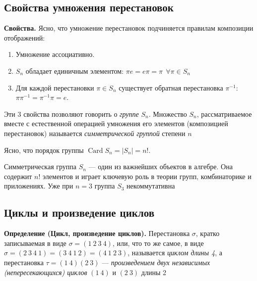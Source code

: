 \documentclass[a4paper,12pt]{article}
\theoremstyle{definition}
\theoremstyle{plain}
\theoremstyle{remark}
\begin{document}
	
	\subsection{Свойства умножения перестановок}
	
	\noindent \textbf{Свойства.}
	Ясно, что умножение перестановок подчиняется правилам композиции отображений:
	\begin{enumerate}
		\item Умножение ассоциативно.
		\item $S_n$ обладает единичным элементом: $\pi e = e \pi = \pi \ \ \forall \pi \in S_n$
		\item Для каждой перестановки $\pi \in S_n$ существует обратная перестановка $\pi^{-1}$: $\pi \pi^{-1} = \pi^{-1} \pi = e$.
	\end{enumerate}
	
	Эти 3 свойства позволяют говорить о \textit{группе} $S_n$. Множество $S_n$, рассматриваемое вместе с естественной операцией умножения его элементов (композицией перестановок) называется \textit{симметрической группой} степени $n$
	
	Ясно, что порядок группы $\operatorname{Card} S_n = |S_n| = n!$.
	
	\begin{tcolorbox}[colback=purple!5, colframe=purple!50!black, title=Заметочка: Симметрическая группа]
		Симметрическая группа $S_n$ — один из важнейших объектов в алгебре. Она содержит $n!$ элементов и играет ключевую роль в теории групп, комбинаторике и приложениях. Уже при $n = 3$ группа $S_3$ некоммутативна
	\end{tcolorbox}
	
	\subsection{Циклы и произведение циклов}
	
	\noindent \textbf{Определение (Цикл, произведение циклов).}
	Перестановка $\sigma$, кратко записываемая в виде $\sigma = (1\ 2\ 3\ 4)$, или, что то же самое,
	в виде $\sigma = (2\ 3\ 4\ 1) = (3\ 4\ 1\ 2) = (4\ 1\ 2\ 3)$, называется \textit{циклом длины 4}, а
	перестановка $\tau = (1\ 4)(2\ 3)$ — \textit{произведением двух независимых (непересекающихся) циклов} $(1\ 4)$ и $(2\ 3)$ длины 2
	
	
	
\end{document}
